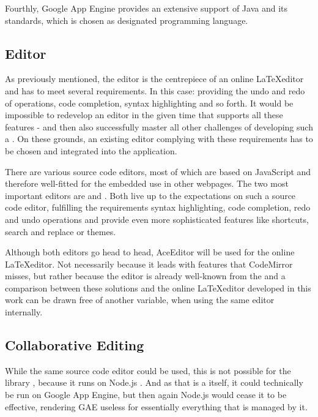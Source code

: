 Fourthly, Google App Engine provides an extensive support of Java and its standards, which is chosen as designated programming language.

\subsection{Editor}
\label{subsec:editor}
As previously mentioned, the editor is the centrepiece of an online \LaTeX editor and has to meet several requirements. In this case: providing the undo and redo of operations, code completion, syntax highlighting and so forth. It would be impossible to redevelop an editor in the given time that supports all these features - and then also successfully master all other challenges of developing such a . On these grounds, an existing editor complying with these requirements has to be chosen and integrated into the application.

There are various source code editors, most of which are based on JavaScript and therefore well-fitted for the embedded use in other webpages. The two most important editors are  and  \cite{website:code-mirror}. Both live up to the expectations on such a source code editor, fulfilling the requirements syntax highlighting, code completion, redo and undo operations and provide even more sophisticated features like shortcuts, search and replace or themes.

Although both editors go head to head, AceEditor will be used for the online \LaTeX editor. Not necessarily because it leads with features that CodeMirror misses, but rather because the editor is already well-known from the  and a comparison between these solutions and the online \LaTeX editor developed in this work can be drawn free of another variable, when using the same editor internally.

\subsection{Collaborative Editing}
\label{subsec:collaborative-editing-approach}
While the same source code editor could be used, this is not possible for the  library , because it runs on Node.js \cite{website:sharejs}. And as that is a  itself, it could technically be run on Google App Engine, but then again Node.js would cease it to be effective, rendering GAE useless for essentially everything that is managed by it.

